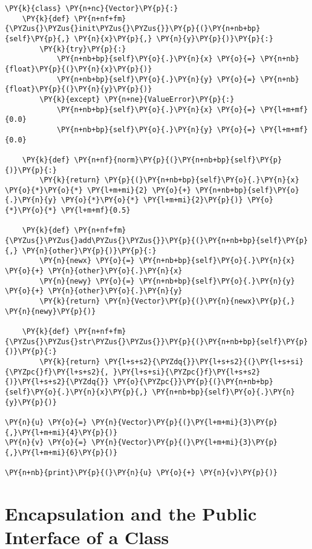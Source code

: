 \begin{Verbatim}[commandchars=\\\{\}]
\PY{k}{class} \PY{n+nc}{Vector}\PY{p}{:}
    \PY{k}{def} \PY{n+nf+fm}{\PYZus{}\PYZus{}init\PYZus{}\PYZus{}}\PY{p}{(}\PY{n+nb+bp}{self}\PY{p}{,} \PY{n}{x}\PY{p}{,} \PY{n}{y}\PY{p}{)}\PY{p}{:}
        \PY{k}{try}\PY{p}{:}
            \PY{n+nb+bp}{self}\PY{o}{.}\PY{n}{x} \PY{o}{=} \PY{n+nb}{float}\PY{p}{(}\PY{n}{x}\PY{p}{)}
            \PY{n+nb+bp}{self}\PY{o}{.}\PY{n}{y} \PY{o}{=} \PY{n+nb}{float}\PY{p}{(}\PY{n}{y}\PY{p}{)}
        \PY{k}{except} \PY{n+ne}{ValueError}\PY{p}{:}
            \PY{n+nb+bp}{self}\PY{o}{.}\PY{n}{x} \PY{o}{=} \PY{l+m+mf}{0.0}
            \PY{n+nb+bp}{self}\PY{o}{.}\PY{n}{y} \PY{o}{=} \PY{l+m+mf}{0.0}

    \PY{k}{def} \PY{n+nf}{norm}\PY{p}{(}\PY{n+nb+bp}{self}\PY{p}{)}\PY{p}{:}
        \PY{k}{return} \PY{p}{(}\PY{n+nb+bp}{self}\PY{o}{.}\PY{n}{x} \PY{o}{*}\PY{o}{*} \PY{l+m+mi}{2} \PY{o}{+} \PY{n+nb+bp}{self}\PY{o}{.}\PY{n}{y} \PY{o}{*}\PY{o}{*} \PY{l+m+mi}{2}\PY{p}{)} \PY{o}{*}\PY{o}{*} \PY{l+m+mf}{0.5}

    \PY{k}{def} \PY{n+nf+fm}{\PYZus{}\PYZus{}add\PYZus{}\PYZus{}}\PY{p}{(}\PY{n+nb+bp}{self}\PY{p}{,} \PY{n}{other}\PY{p}{)}\PY{p}{:}
        \PY{n}{newx} \PY{o}{=} \PY{n+nb+bp}{self}\PY{o}{.}\PY{n}{x} \PY{o}{+} \PY{n}{other}\PY{o}{.}\PY{n}{x}
        \PY{n}{newy} \PY{o}{=} \PY{n+nb+bp}{self}\PY{o}{.}\PY{n}{y} \PY{o}{+} \PY{n}{other}\PY{o}{.}\PY{n}{y}
        \PY{k}{return} \PY{n}{Vector}\PY{p}{(}\PY{n}{newx}\PY{p}{,} \PY{n}{newy}\PY{p}{)}

    \PY{k}{def} \PY{n+nf+fm}{\PYZus{}\PYZus{}str\PYZus{}\PYZus{}}\PY{p}{(}\PY{n+nb+bp}{self}\PY{p}{)}\PY{p}{:}
        \PY{k}{return} \PY{l+s+s2}{\PYZdq{}}\PY{l+s+s2}{(}\PY{l+s+si}{\PYZpc{}f}\PY{l+s+s2}{, }\PY{l+s+si}{\PYZpc{}f}\PY{l+s+s2}{)}\PY{l+s+s2}{\PYZdq{}} \PY{o}{\PYZpc{}}\PY{p}{(}\PY{n+nb+bp}{self}\PY{o}{.}\PY{n}{x}\PY{p}{,} \PY{n+nb+bp}{self}\PY{o}{.}\PY{n}{y}\PY{p}{)}

\PY{n}{u} \PY{o}{=} \PY{n}{Vector}\PY{p}{(}\PY{l+m+mi}{3}\PY{p}{,}\PY{l+m+mi}{4}\PY{p}{)}
\PY{n}{v} \PY{o}{=} \PY{n}{Vector}\PY{p}{(}\PY{l+m+mi}{3}\PY{p}{,}\PY{l+m+mi}{6}\PY{p}{)}

\PY{n+nb}{print}\PY{p}{(}\PY{n}{u} \PY{o}{+} \PY{n}{v}\PY{p}{)}
\end{Verbatim}


\section{Encapsulation and the Public Interface of a Class}


